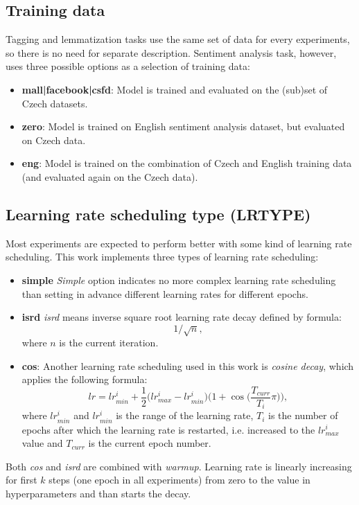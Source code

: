 \subsection{Training data}
Tagging and lemmatization tasks use the same set of data for every experiments, so there is no need for separate description. Sentiment analysis task, however, uses three possible options as a selection of training data:
\begin{itemize}
\item \textbf{mall|facebook|csfd}: Model is trained and evaluated on the (sub)set of Czech datasets.
\item \textbf{zero}: Model is trained on English sentiment analysis dataset, but evaluated on Czech data.
\item \textbf{eng}: Model is trained on the combination of Czech and English training data (and evaluated again on the Czech data). %
\end{itemize}
\subsection{Learning rate scheduling type (LRTYPE)}
Most experiments are expected to perform better with some kind of learning rate scheduling. This work implements three types of learning rate scheduling:
\begin{itemize}
\item \textbf{simple} \textit{Simple} option indicates no more complex learning rate scheduling than setting in advance different learning rates for different epochs.
\item \textbf{isrd} %
\textit{isrd} means inverse square root learning rate decay defined by formula: $$1/\sqrt{n},$$  where $n$ is the current iteration.
\item \textbf{cos}: Another learning rate scheduling used in this work is \textit{cosine decay}, %
which applies the following formula: $$lr=lr_{min}^{i} + \frac{1}{2}\bigg(lr_{max}^{i} - lr_{min}^{i}\bigg)\bigg(1+\cos\bigg(\frac{T_{curr}}{T_i}\pi\bigg)\bigg),$$ where $lr_{min}^{i}$ and $lr_{min}^{i}$ is the range of the learning rate, $T_i$ is the number of epochs after which the learning rate is restarted, i.e. increased to the $lr_{max}^{i}$ value and $T_{curr}$ is the current epoch number.
\end{itemize}
Both \textit{cos} and \textit{isrd} are combined with \textit{warmup}. Learning rate is linearly increasing for first $k$ steps (one epoch in all experiments) from zero to the value in hyperparameters and than starts the decay.

